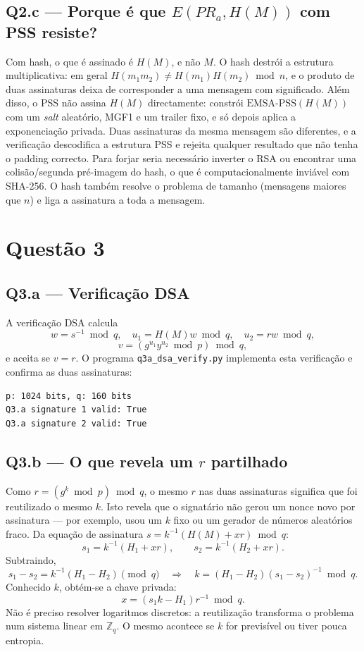\documentclass[11pt,a4paper]{article}
\begin{document}
\subsection*{Q2.c --- Porque é que $E(PR_a, H(M))$ com PSS resiste?}

Com hash, o que é assinado é $H(M)$, e não $M$. O hash destrói a estrutura
multiplicativa: em geral
$H(m_1 m_2) \neq H(m_1)H(m_2) \bmod n$, e o produto de duas assinaturas deixa
de corresponder a uma mensagem com significado. Além disso, o PSS não assina
$H(M)$ directamente: constrói
$\mathrm{EMSA\text{-}PSS}(H(M))$ com um \emph{salt} aleatório, MGF1 e um
trailer fixo, e só depois aplica a exponenciação privada. Duas assinaturas da
mesma mensagem são diferentes, e a verificação descodifica a estrutura PSS e
rejeita qualquer resultado que não tenha o padding correcto. Para forjar seria
necessário inverter o RSA ou encontrar uma colisão/segunda pré-imagem do hash,
o que é computacionalmente inviável com SHA-256. O hash também resolve o
problema de tamanho (mensagens maiores que $n$) e liga a assinatura a toda a
mensagem.

\section*{Questão 3}

\subsection*{Q3.a --- Verificação DSA}

A verificação DSA \cite{fips186} calcula
\[
w = s^{-1} \bmod q,\quad u_1 = H(M)w \bmod q,\quad u_2 = rw \bmod q,
\]
\[
v = \left(g^{u_1} y^{u_2} \bmod p\right) \bmod q,
\]
e aceita se $v = r$. O programa \texttt{q3a\_dsa\_verify.py} implementa esta
verificação e confirma as duas assinaturas:

\begin{verbatim}
p: 1024 bits, q: 160 bits
Q3.a signature 1 valid: True
Q3.a signature 2 valid: True
\end{verbatim}

\subsection*{Q3.b --- O que revela um $r$ partilhado}

Como $r = (g^k \bmod p) \bmod q$, o mesmo $r$ nas duas assinaturas significa
que foi reutilizado o mesmo $k$. Isto revela que o signatário não gerou um
nonce novo por assinatura --- por exemplo, usou um $k$ fixo ou um gerador de
números aleatórios fraco. Da equação de assinatura
$s = k^{-1}(H(M) + xr) \bmod q$:
\[
s_1 = k^{-1}(H_1 + xr), \qquad s_2 = k^{-1}(H_2 + xr).
\]
Subtraindo,
\[
s_1 - s_2 = k^{-1}(H_1 - H_2) \pmod q
\quad\Longrightarrow\quad
k = (H_1 - H_2)(s_1 - s_2)^{-1} \bmod q .
\]
Conhecido $k$, obtém-se a chave privada:
\[
x = (s_1 k - H_1) r^{-1} \bmod q .
\]
Não é preciso resolver logaritmos discretos: a reutilização transforma o
problema num sistema linear em $\mathbb{Z}_q$. O mesmo acontece se $k$ for
previsível ou tiver pouca entropia.
\end{document}
